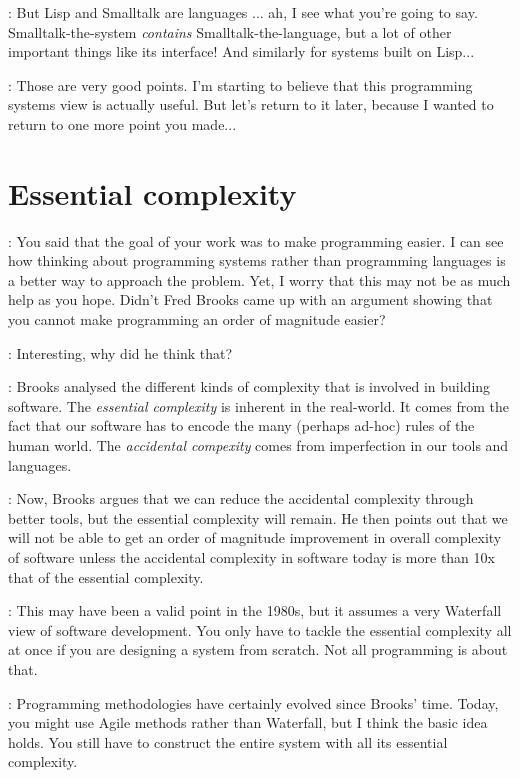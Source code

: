 \documentclass[runningheads]{llncs}
\newcommand{\T}{Tomas}
\newcommand{\J}{Joel}
\newcommand{\says}[2][gg]{\vspace{0.5em}\noindent\hangindent=0.5cm{\textsc{#1}}: #2}
\begin{document}
\says[\T]{But Lisp and Smalltalk are languages ... ah, I see what you're going to say. Smalltalk-the-system \emph{contains} Smalltalk-the-language, but a lot of other important things like its interface! And similarly for systems built on Lisp...}

\says[\T]{Those are very good points. I'm starting to believe that this programming systems view is actually useful. But let's return to it later, because I wanted to return to one more point you made...}

\section{Essential complexity}

\says[\T]{You said that the goal of your work was to make programming easier. I can see how thinking about programming systems rather than programming languages is a better way to approach the problem. Yet, I worry that this may not be as much help as you hope. Didn't Fred Brooks came up with an argument showing that you cannot make programming an order of magnitude easier?}

\says[\J]{Interesting, why did he think that?}

\says[\T]{Brooks \cite{brooks-1987-silver} analysed the different kinds of complexity that is involved in building software. The \emph{essential complexity} is inherent in the real-world. It comes from the fact that our software has to encode the many (perhaps ad-hoc) rules of the human world. The \emph{accidental compexity} comes from imperfection in our tools and languages.}

\says[\T]{Now, Brooks argues that we can reduce the accidental complexity through better tools, but the essential complexity will remain. He then points out that we will not be able to get an order of magnitude improvement in overall complexity of software unless the accidental complexity in software today is more than 10x that of the essential complexity.}

\says[\J]{This may have been a valid point in the 1980s, but it assumes a very Waterfall view of software development. You only have to tackle the essential complexity all at once if you are designing a system from scratch. Not all programming is about that.}

\says[\T]{Programming methodologies have certainly evolved since Brooks' time. Today, you might use Agile methods rather than Waterfall, but I think the basic idea holds. You still have to construct the entire system with all its essential complexity.}
\end{document}
